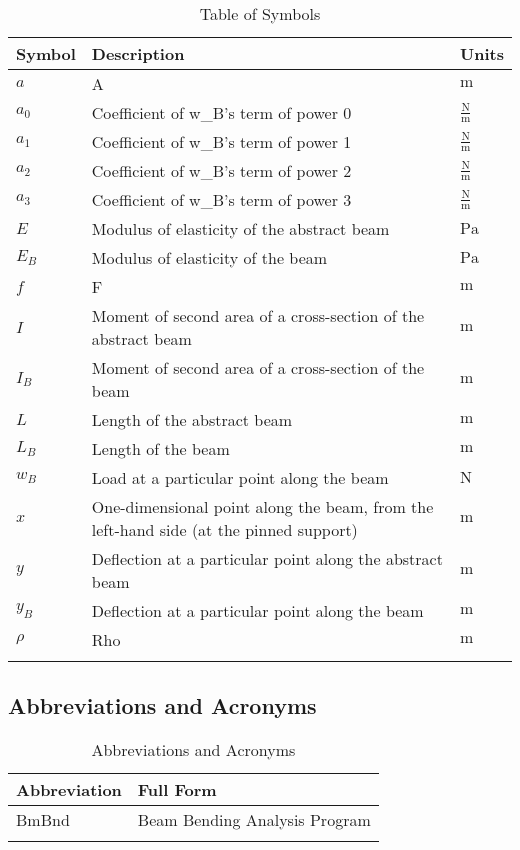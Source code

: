 \documentclass[12pt]{article}
\begin{document}
\begin{longtabu}{l X[l] l}
\toprule
\textbf{Symbol} & \textbf{Description} & \textbf{Units}
\\
\midrule
\endhead
$a$ & A & ${\text{m}}$
\\
${a_{\text{0}}}$ & Coefficient of w\_B's term of power 0 & $\frac{\text{N}}{\text{m}}$
\\
${a_{\text{1}}}$ & Coefficient of w\_B's term of power 1 & $\frac{\text{N}}{\text{m}}$
\\
${a_{\text{2}}}$ & Coefficient of w\_B's term of power 2 & $\frac{\text{N}}{\text{m}}$
\\
${a_{\text{3}}}$ & Coefficient of w\_B's term of power 3 & $\frac{\text{N}}{\text{m}}$
\\
$E$ & Modulus of elasticity of the abstract beam & ${\text{Pa}}$
\\
${E_{B}}$ & Modulus of elasticity of the beam & ${\text{Pa}}$
\\
$f$ & F & ${\text{m}}$
\\
$I$ & Moment of second area of a cross-section of the abstract beam & ${\text{m}}$
\\
${I_{B}}$ & Moment of second area of a cross-section of the beam & ${\text{m}}$
\\
$L$ & Length of the abstract beam & ${\text{m}}$
\\
${L_{B}}$ & Length of the beam & ${\text{m}}$
\\
${w_{B}}$ & Load at a particular point along the beam & ${\text{N}}$
\\
$x$ & One-dimensional point along the beam, from the left-hand side (at the pinned support) & ${\text{m}}$
\\
$y$ & Deflection at a particular point along the abstract beam & ${\text{m}}$
\\
${y_{B}}$ & Deflection at a particular point along the beam & ${\text{m}}$
\\
$ρ$ & Rho & ${\text{m}}$
\\
\bottomrule
\caption{Table of Symbols}
\label{Table:ToS}
\end{longtabu}
\subsection{Abbreviations and Acronyms}
\label{Sec:TAbbAcc}
\begin{longtable}{l l}
\toprule
\textbf{Abbreviation} & \textbf{Full Form}
\\
\midrule
\endhead
BmBnd & Beam Bending Analysis Program
\\
\bottomrule
\caption{Abbreviations and Acronyms}
\label{Table:TAbbAcc}
\end{longtable}
\end{document}
